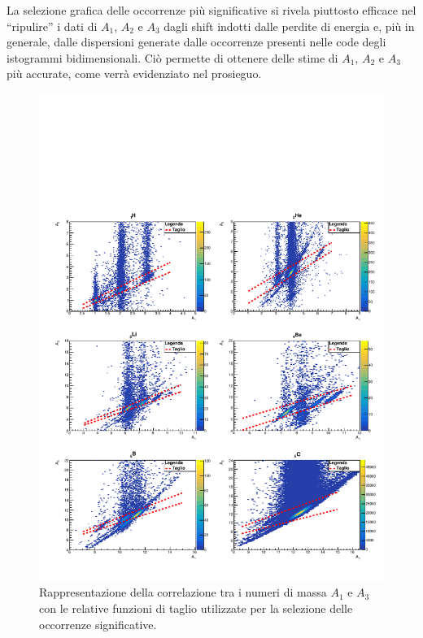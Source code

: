\documentclass[12pt,a4paper,twoside]{report}
\begin{document}
	La selezione grafica delle occorrenze più significative si rivela piuttosto efficace nel ``ripulire'' i dati di $A_1$, $A_2$ e $A_3$ dagli shift indotti dalle perdite di energia e, più in generale, dalle dispersioni generate dalle occorrenze presenti nelle code degli istogrammi bidimensionali. Ciò permette di ottenere delle stime di $A_1$, $A_2$ e $A_3$ più accurate, come verrà evidenziato nel prosieguo.
	\begin{figure}[H]
		\centering
		\includegraphics[width=1.03\linewidth,center]{c_MultiCanvasCut2.pdf}
		\caption{Rappresentazione della correlazione tra i numeri di massa $A_1$ e $A_3$ con le relative funzioni di taglio utilizzate per la selezione delle occorrenze significative.}
		\label{fig:a2_cut}
	\end{figure}
\end{document}
